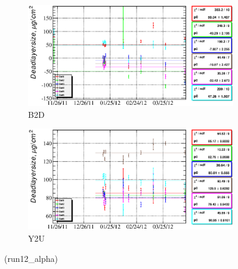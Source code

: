 \documentclass[a4paper,12pt]{article}
\begin{document}
\begin{figure}[htb]
\begin{subfigure}[t]{0.49\textwidth}
\includegraphics[width=\textwidth]{gfx/run12_alpha/B2D/c_chDeadLayerSize_by_day_B2D.eps}
\caption{B2D}
\end{subfigure}
%
\hfill
%
\begin{subfigure}[t]{0.49\textwidth}
\includegraphics[width=\textwidth]{gfx/run12_alpha/Y2U/c_chDeadLayerSize_by_day_Y2U.eps}
\caption{Y2U}
\end{subfigure}
\caption{\xdllabel{} (run12\_alpha)}
\end{figure}
\end{document}
